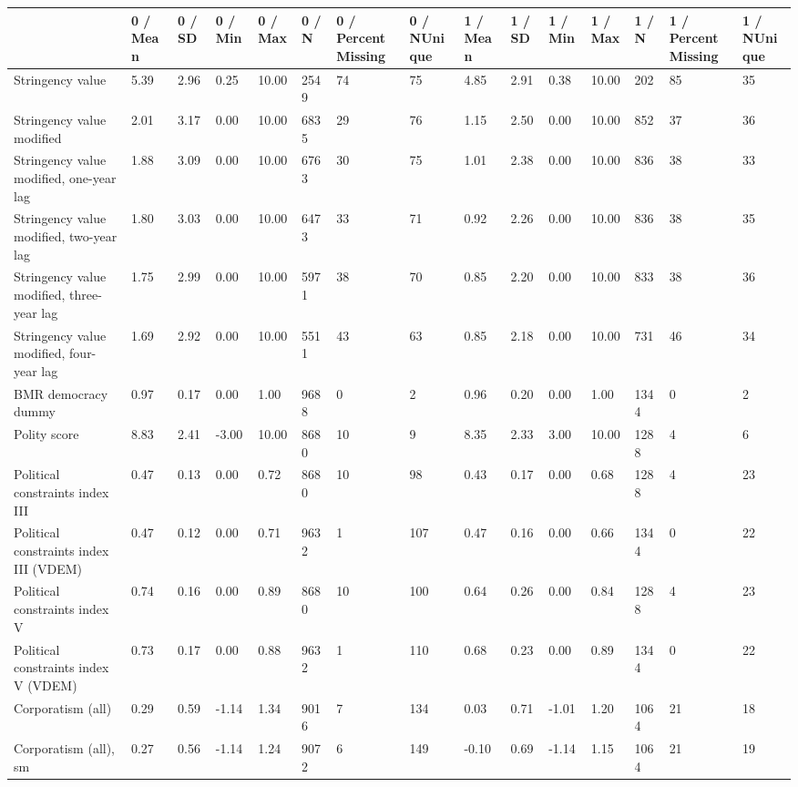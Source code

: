 
\begin{longtable}{lllllllllllllll}
\toprule
  & 0 / Mean & 0 / SD & 0 / Min & 0 / Max & 0 / N & 0 / PercentMissing & 0 / NUnique & 1 / Mean & 1 / SD & 1 / Min & 1 / Max & 1 / N & 1 / PercentMissing & 1 / NUnique\\
\midrule
Stringency value & 5.39 & 2.96 & 0.25 & 10.00 & 2549 & 74 & 75 & 4.85 & 2.91 & 0.38 & 10.00 & 202 & 85 & 35\\
Stringency value modified & 2.01 & 3.17 & 0.00 & 10.00 & 6835 & 29 & 76 & 1.15 & 2.50 & 0.00 & 10.00 & 852 & 37 & 36\\
Stringency value modified, one-year lag & 1.88 & 3.09 & 0.00 & 10.00 & 6763 & 30 & 75 & 1.01 & 2.38 & 0.00 & 10.00 & 836 & 38 & 33\\
Stringency value modified, two-year lag & 1.80 & 3.03 & 0.00 & 10.00 & 6473 & 33 & 71 & 0.92 & 2.26 & 0.00 & 10.00 & 836 & 38 & 35\\
Stringency value modified, three-year lag & 1.75 & 2.99 & 0.00 & 10.00 & 5971 & 38 & 70 & 0.85 & 2.20 & 0.00 & 10.00 & 833 & 38 & 36\\
\addlinespace
Stringency value modified, four-year lag & 1.69 & 2.92 & 0.00 & 10.00 & 5511 & 43 & 63 & 0.85 & 2.18 & 0.00 & 10.00 & 731 & 46 & 34\\
BMR democracy dummy & 0.97 & 0.17 & 0.00 & 1.00 & 9688 & 0 & 2 & 0.96 & 0.20 & 0.00 & 1.00 & 1344 & 0 & 2\\
Polity score & 8.83 & 2.41 & -3.00 & 10.00 & 8680 & 10 & 9 & 8.35 & 2.33 & 3.00 & 10.00 & 1288 & 4 & 6\\
Political constraints index III & 0.47 & 0.13 & 0.00 & 0.72 & 8680 & 10 & 98 & 0.43 & 0.17 & 0.00 & 0.68 & 1288 & 4 & 23\\
Political constraints index III (VDEM) & 0.47 & 0.12 & 0.00 & 0.71 & 9632 & 1 & 107 & 0.47 & 0.16 & 0.00 & 0.66 & 1344 & 0 & 22\\
\addlinespace
Political constraints index V & 0.74 & 0.16 & 0.00 & 0.89 & 8680 & 10 & 100 & 0.64 & 0.26 & 0.00 & 0.84 & 1288 & 4 & 23\\
Political constraints index V (VDEM) & 0.73 & 0.17 & 0.00 & 0.88 & 9632 & 1 & 110 & 0.68 & 0.23 & 0.00 & 0.89 & 1344 & 0 & 22\\
Corporatism (all) & 0.29 & 0.59 & -1.14 & 1.34 & 9016 & 7 & 134 & 0.03 & 0.71 & -1.01 & 1.20 & 1064 & 21 & 18\\
Corporatism (all), sm & 0.27 & 0.56 & -1.14 & 1.24 & 9072 & 6 & 149 & -0.10 & 0.69 & -1.14 & 1.15 & 1064 & 21 & 19\\

\end{longtable}
